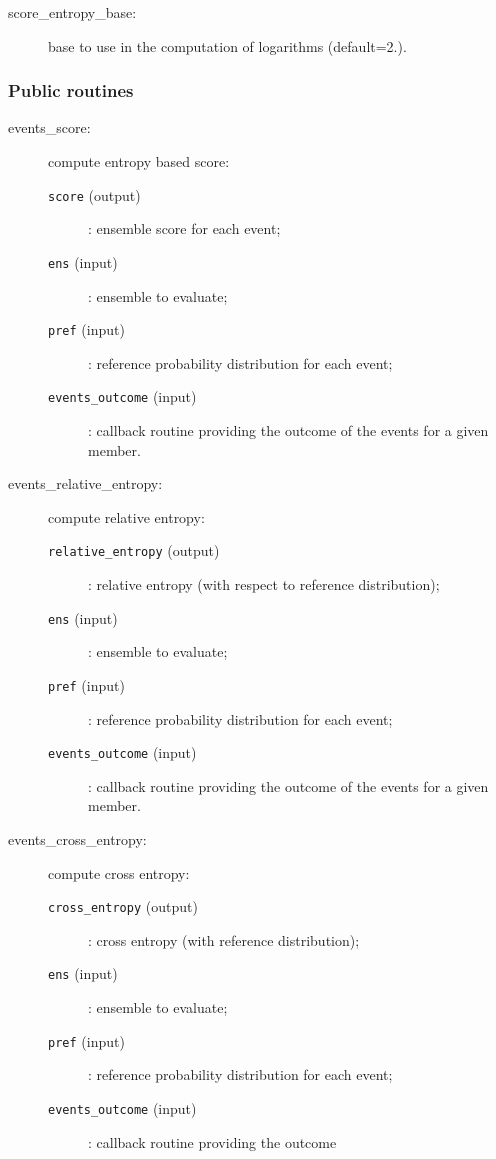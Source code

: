 \documentclass[11pt]{article}
\begin{document}
\begin{description}
\item[score\_entropy\_base:] base to use in the computation of logarithms (default=2.).
\end{description}

\subsubsection*{Public routines}

\begin{description}
\item[events\_score:] compute entropy based score:
  \begin{description}
  \item[{\tt score} (output)]: ensemble score for each event;
  \item[{\tt ens} (input)]: ensemble to evaluate;
  \item[{\tt pref} (input)]: reference probability distribution for each event;
  \item[{\tt events\_outcome} (input)]: callback routine providing the outcome
                                        of the events for a given member.
  \end{description}
\item[events\_relative\_entropy:] compute relative entropy:
  \begin{description}
  \item[{\tt relative\_entropy} (output)]: relative entropy (with respect to reference distribution);
  \item[{\tt ens} (input)]: ensemble to evaluate;
  \item[{\tt pref} (input)]: reference probability distribution for each event;
  \item[{\tt events\_outcome} (input)]: callback routine providing the outcome
                                        of the events for a given member.
  \end{description}
\item[events\_cross\_entropy:] compute cross entropy:
  \begin{description}
  \item[{\tt cross\_entropy} (output)]: cross entropy (with reference distribution);
  \item[{\tt ens} (input)]: ensemble to evaluate;
  \item[{\tt pref} (input)]: reference probability distribution for each event;
  \item[{\tt events\_outcome} (input)]: callback routine providing the outcome

\end{description}
\end{description}
\end{document}

